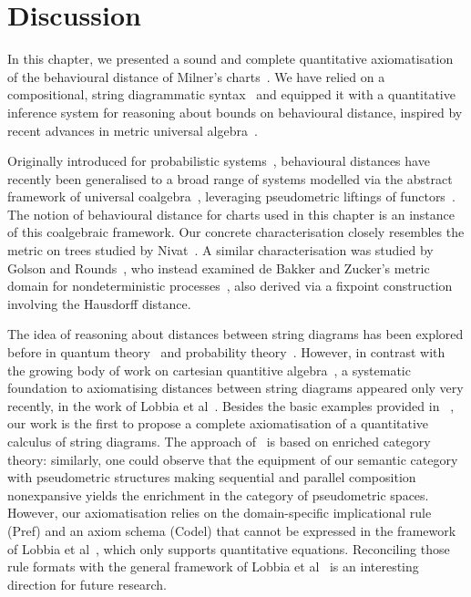 \section{Discussion}
\label{sec:discussion}

In this chapter, we presented a sound and complete quantitative axiomatisation of the behavioural distance of Milner's charts~\cite{Milner:1984:Complete}. We have relied on a compositional, string diagrammatic syntax~\cite{piedeleu2023finite,antoinecsl2025} and equipped it with a quantitative inference system for reasoning about bounds on behavioural distance, inspired by recent advances in metric universal algebra~\cite{Mardare:2016:Quantitative,MiliusU19,Mio:2024:Universal}.

Originally introduced for probabilistic systems~\cite{Breugel:2001:Towards,Desharnais:2004:Metrics}, behavioural distances have recently been generalised to a broad range of systems modelled via the abstract framework of universal coalgebra~\cite{Rutten:2000:Universal}, leveraging pseudometric liftings of functors~\cite{Baldan:2018:Coalgebraic}. The notion of behavioural distance for charts used in this chapter is an instance of this coalgebraic framework. Our concrete characterisation closely resembles the metric on trees studied by Nivat~\cite{Nivat:1979:Infinite}. A similar characterisation was studied by Golson and Rounds~\cite{Golson:1984:Connections}, who instead examined de Bakker and Zucker's metric domain for nondeterministic processes~\cite{Bakker:1982:Processes}, also derived via a fixpoint construction involving the Hausdorff distance. 

The idea of reasoning about distances between string diagrams has been explored before in quantum theory~\cite{kissinger2017pictureperfectquantumkeydistribution,Breiner:2019:Graphical,HLarsen2021} and probability theory~\cite{Perrone:2024:Markov}. However, in contrast with the growing body of work on cartesian quantitive algebra~\cite{Mardare:2016:Quantitative,Mio:2024:Universal, Bacci:2024:Sum}, a systematic foundation to axiomatising distances between string diagrams appeared only very recently, in the work of Lobbia et al~\cite{Lobbia:2024:Quantitative}. Besides the basic examples provided in~ \cite{Lobbia:2024:Quantitative}, our work is the first to propose a complete axiomatisation of a quantitative calculus of string diagrams. The approach of~\cite{Lobbia:2024:Quantitative} is based on enriched category theory: similarly, one could observe that the equipment of our semantic category with pseudometric structures making sequential and parallel composition nonexpansive yields the enrichment in the category of pseudometric spaces. However, our axiomatisation relies on the domain-specific implicational rule \textsf{(Pref)} and an axiom schema \textsf{(Codel)} that cannot be expressed in the framework of Lobbia et al~\cite{Lobbia:2024:Quantitative}, which only supports quantitative equations. Reconciling those rule formats with the general framework of Lobbia et al~\cite{Lobbia:2024:Quantitative} is an interesting direction for future research.

